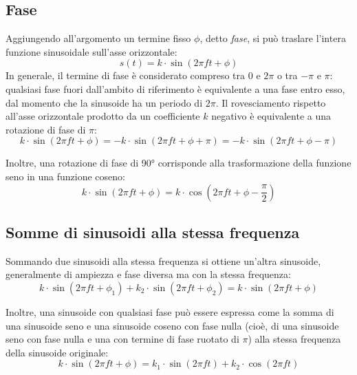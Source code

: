 \documentclass[11pt]{report}
\begin{document}
\subsection{Fase}

Aggiungendo all'argomento un termine fisso $\phi$, detto \emph{fase}, si può traslare l'intera funzione sinusoidale sull'asse orizzontale:
\begin{equation}
s(t) = k \cdot \sin(2 \pi f t + \phi)
\end{equation}
In generale, il termine di fase è considerato compreso tra 0 e $2 \pi$ o tra $-\pi$ e $\pi$: qualsiasi fase fuori dall'ambito di riferimento è equivalente a una fase entro esso, dal momento che la sinusoide ha un periodo di $2 \pi$. Il rovesciamento rispetto all'asse orizzontale prodotto da un coefficiente $k$ negativo è equivalente a una rotazione di fase di $\pi$:
\begin{equation}
k \cdot \sin(2 \pi f t + \phi) = -k \cdot \sin(2 \pi f t + \phi + \pi) = -k \cdot \sin(2 \pi f t + \phi - \pi)
\end{equation}

Inoltre, una rotazione di fase di 90° corrisponde alla trasformazione della funzione seno in una funzione coseno:
\begin{equation}
k \cdot \sin(2 \pi f t + \phi) = k \cdot \cos(2 \pi f t + \phi - \frac{\pi}{2})
\end{equation}


\subsection{Somme di sinusoidi alla stessa frequenza}

Sommando due sinusoidi alla stessa frequenza si ottiene un'altra sinusoide, generalmente di ampiezza e fase diversa ma con la stessa frequenza:
\begin{equation}
k \cdot \sin(2 \pi f t + \phi_1) +  k_2 \cdot \sin(2 \pi f t + \phi_2) = k \cdot \sin(2 \pi f t + \phi)
\end{equation}

Inoltre, una sinusoide con qualsiasi fase può essere espressa come la somma di una sinusoide seno e una sinusoide coseno con fase nulla (cioè, di una sinusoide seno con fase nulla e una con termine di fase ruotato di $\pi$) alla stessa frequenza della sinusoide originale:
\begin{equation}
k \cdot \sin(2 \pi f t + \phi) = k_1 \cdot \sin(2 \pi f t) + k_2 \cdot \cos(2 \pi f t)
\end{equation}
\end{document}
